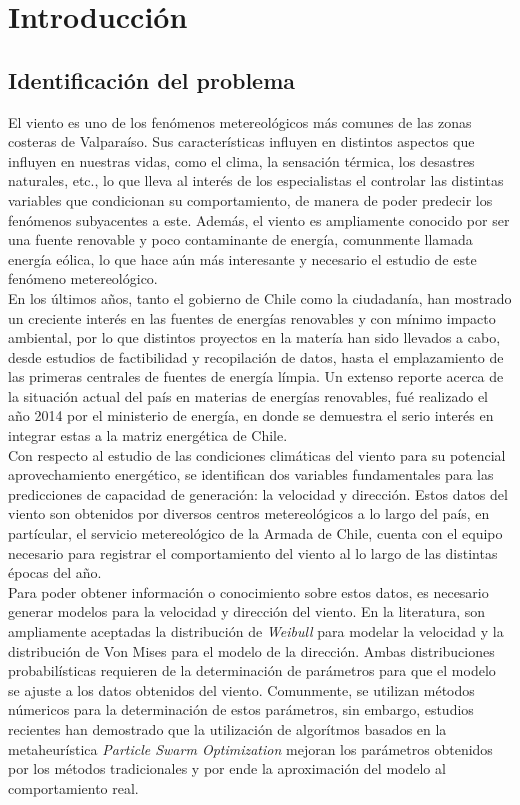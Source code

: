 
\chapter{Introducción}

\section{Identificación del problema}
El viento es uno de los fenómenos metereológicos más comunes de las zonas costeras de Valparaíso. Sus características influyen en distintos aspectos que influyen en nuestras vidas, como el clima, la sensación térmica, los desastres naturales, etc., lo que lleva al interés de los especialistas el controlar las distintas variables que condicionan su comportamiento, de manera de poder predecir los fenómenos subyacentes a este. Además, el viento es ampliamente conocido por ser una fuente renovable y poco contaminante de energía, comunmente llamada energía eólica, lo que hace aún más interesante y necesario el estudio de este fenómeno metereológico.\\
En los últimos años, tanto el gobierno de Chile como la ciudadanía, han mostrado un creciente interés en las fuentes de energías renovables y con mínimo impacto ambiental, por lo que distintos proyectos en la matería han sido llevados a cabo, desde estudios de factibilidad y recopilación de datos, hasta el emplazamiento de las primeras centrales de fuentes de energía límpia. Un extenso reporte acerca de la situación actual del país en materias de energías renovables, fué realizado el año 2014 por el ministerio de energía, en donde se demuestra el serio interés en integrar estas a la matriz energética de Chile. \cite{minenergia14}\\
Con respecto al estudio de las condiciones climáticas del viento para su potencial aprovechamiento energético, se identifican dos variables fundamentales para las predicciones de capacidad de generación: la velocidad y dirección. Estos datos del viento son obtenidos por diversos centros metereológicos a lo largo del país, en partícular, el servicio metereológico de la Armada de Chile, cuenta con el equipo necesario para registrar el comportamiento del viento al lo largo de las distintas épocas del año.\\
Para poder obtener información o conocimiento sobre estos datos, es necesario generar modelos para la velocidad y dirección del viento. En la literatura, son ampliamente aceptadas la distribución de \emph{Weibull} para modelar la velocidad y la distribución de Von Mises para el modelo de la dirección. Ambas distribuciones probabilísticas requieren de la determinación de parámetros para que el modelo se ajuste a los datos obtenidos del viento. Comunmente, se utilizan métodos númericos para la determinación de estos parámetros, sin embargo, estudios recientes han demostrado que la utilización de algorítmos basados en la metaheurística \emph{Particle Swarm Optimization} mejoran los parámetros obtenidos por los métodos tradicionales y por ende la aproximación del modelo al comportamiento real.



